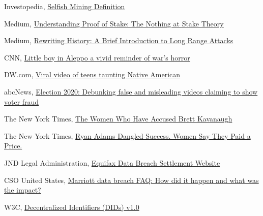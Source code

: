 \documentclass[target=mst,aauheader=]{thud}
\begin{document}
\begin{thebibliography}{99}
    Investopedia, \href{https://www.investopedia.com/terms/s/selfish-mining.asp}{Selfish Mining Definition}

    Medium, \href{https://medium.com/coinmonks/understanding-proof-of-stake-the-nothing-at-stake-theory-1f0d71bc027}{Understanding Proof of Stake: The Nothing at Stake Theory}

    Medium, \href{https://blog.positive.com/rewriting-history-a-brief-introduction-to-long-range-attacks-54e473acdba9}{Rewriting History: A Brief Introduction to Long Range Attacks}


    CNN, \href{https://edition.cnn.com/2016/08/17/world/syria-little-boy-airstrike-victim/index.html}{Little boy in Aleppo a vivid reminder of war’s horror}

    DW.com, \href{https://www.dw.com/en/outrage-as-teens-mock-native-american-at-washington-rally/a-47156592}{Viral video of teens taunting Native American}

    abcNews, \href{https://abcnews.go.com/Politics/election-2020-debunking-false-misleading-videos-claiming-show/story?id=74148233}{Election 2020: Debunking false and misleading videos claiming to show voter fraud}

    The New York Times, \href{https://www.nytimes.com/2018/09/26/us/politics/brett-kavanaugh-accusers-women.html}{The Women Who Have Accused Brett Kavanaugh}

    The New York Times, \href{2019, a journalist from the New York Times conducted an interview with a woman who accused the musician Ryan Adams of sexual misconduct}{Ryan Adams Dangled Success. Women Say They Paid a Price.}

    JND Legal Administration, \href{https://www.equifaxbreachsettlement.com/}{Equifax Data Breach Settlement Website}

    CSO United States, \href{https://www.csoonline.com/article/3441220/marriott-data-breach-faq-how-did-it-happen-and-what-was-the-impact.html}{Marriott data breach FAQ: How did it happen and what was the impact?}

    W3C, \href{https://w3c.github.io/did-core/}{Decentralized Identifiers (DIDs) v1.0}


\end{thebibliography}
\end{document}
